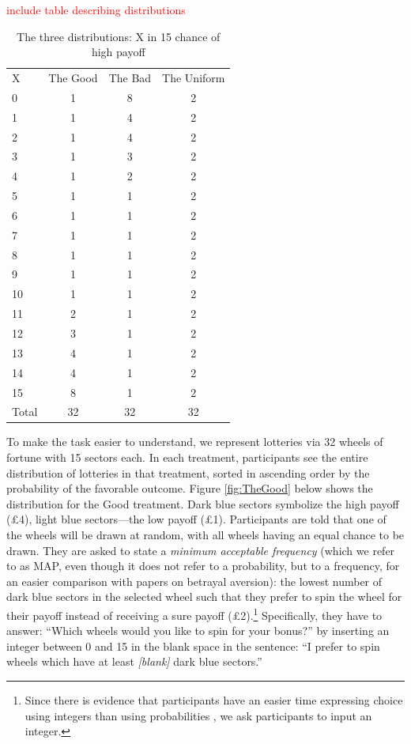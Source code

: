 \textcolor{red}{include table describing distributions}
\begin{table}[htbp]
\centering \caption{The three distributions: X in 15 chance of high payoff}\label{tab:distr}
\begin{threeparttable}
\begin{tabular}
   {@{}
	l
	*3c
	@{}
	}
\toprule
X 	&	{The Good}&{The Bad}&	{The Uniform}\\
\cmidrule{2-4}
0	&	1&       8&	2\\
1	&	1&       4&	2\\
2	&	1&       4&	2\\
3	&	1&       3&	2\\
4	&	1&       2&	2\\
5	&	1&       1&	2\\
6	&	1&       1&	2\\
7	&	1&       1&	2\\
8	&	1&       1&	2\\
9	&	1&       1&	2\\
10	&	1&       1&	2\\
11	&	2&       1&	2\\
12	&	3&       1&	2\\
13	&	4&       1&	2\\
14	&	4&       1&	2\\
15	&	8&       1&	2\\
\midrule
Total	&	32&       32&	32\\
\bottomrule

\end{tabular}
\end{threeparttable}
\end{table}

To make the task easier to understand, we represent lotteries via 32 wheels of fortune with 15 sectors each.
In each treatment, participants see the entire distribution of lotteries in that treatment, sorted in ascending order by the probability of the favorable outcome.
Figure \ref{fig:TheGood} below shows the distribution for the Good treatment.
Dark blue sectors symbolize the high payoff (\pounds4), light blue sectors---the low payoff (\pounds1).
Participants are told that one of the wheels will be drawn at random, with all wheels having an equal chance to be drawn.
They are asked to state a \textit{minimum acceptable frequency} (which we refer to as MAP, even though it does not refer to a probability, but to a frequency, for an easier comparison with papers on betrayal aversion): the lowest number of dark blue sectors in the selected wheel such that they prefer to spin the wheel for their payoff instead of receiving a sure payoff (\pounds2).\footnote{
Since there is evidence that participants have an easier time expressing choice using integers than using probabilities \citep{Quercia2016}, we ask participants to input an integer.}
Specifically, they have to answer: ``Which wheels would you like to spin for your bonus?'' by inserting an integer between 0 and 15 in the blank space in the sentence: ``I prefer to spin wheels which have at least \textit{[blank]} dark blue sectors.''

